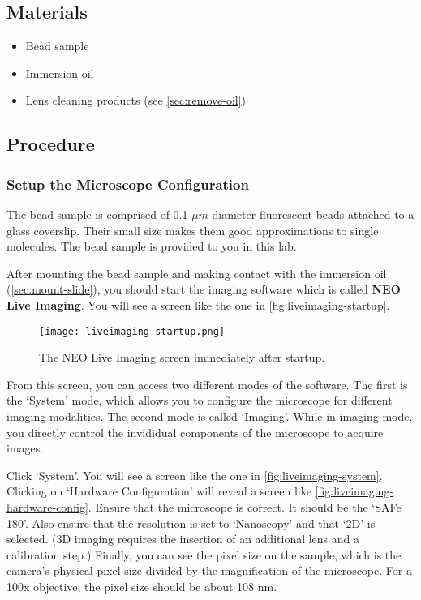 \documentclass[10pt,a4paper,oneside]{book}
\begin{document}
\subsection{Materials}

\begin{itemize}
    \item{Bead sample}
    \item{Immersion oil}
    \item{Lens cleaning products (see \autoref{sec:remove-oil})}
\end{itemize}

\subsection{Procedure}

\subsubsection{Setup the Microscope Configuration}

The bead sample is comprised of 0.1 $\mu m$ diameter fluorescent beads attached to a glass coverslip. Their small size makes them good approximations to single molecules. The bead sample is provided to you in this lab.

After mounting the bead sample and making contact with the immersion oil (\autoref{sec:mount-slide}), you should start the imaging software which is called \textbf{NEO Live Imaging}. You will see a screen like the one in \autoref{fig:liveimaging-startup}.

\begin{figure}[ht]
    \centering
    \texttt{[image: liveimaging-startup.png]}
    \caption{The NEO Live Imaging screen immediately after startup.}
    \label{fig:liveimaging-startup}
\end{figure}

From this screen, you can access two different modes of the software. The first is the `System' mode, which allows you to configure the microscope for different imaging modalities. The second mode is called `Imaging'. While in imaging mode, you directly control the invididual components of the microscope to acquire images.

Click `System'. You will see a screen like the one in \autoref{fig:liveimaging-system}. Clicking on `Hardware Configuration' will reveal a screen like \autoref{fig:liveimaging-hardware-config}. Ensure that the microscope is correct. It should be the `SAFe 180'. Also ensure that the resolution is set to `Nanoscopy' and that `2D' is selected. (3D imaging requires the insertion of an additional lens and a calibration step.) Finally, you can see the pixel size on the sample, which is the camera's physical pixel size divided by the magnification of the microscope. For a 100x objective, the pixel size should be about 108 nm.
\end{document}
